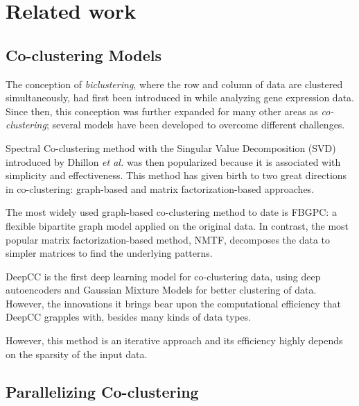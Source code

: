 
\section{Related work}
\label{sec:related_work}
\subsection{Co-clustering Models}

The conception of \emph{biclustering}, where the row and column of data are clustered simultaneously, had first been introduced in\cite{hartigan1972DirectClusteringData} while analyzing gene expression data. Since then, this conception was further expanded for many other areas as \emph{co-clustering}; several models have been developed to overcome different challenges.

Spectral Co-clustering method with the Singular Value Decomposition (SVD) introduced by  Dhillon \textit{et al.} \cite{dhillon2001CoclusteringDocumentsWords} was then popularized because it is associated with simplicity and effectiveness. This method has given birth to two great directions in co-clustering: graph-based and matrix factorization-based approaches. 

The most widely used graph-based co-clustering method to date is FBGPC\cite{chen2023FastFlexibleBipartitea}: a flexible bipartite graph model applied on the original data. In contrast, the most popular matrix factorization-based method, NMTF\cite{long2005CoclusteringBlockValue}, decomposes the data to simpler matrices to find the underlying patterns. 

DeepCC\cite{dongkuanxu2019DeepCoClustering} is the first deep learning model for co-clustering data, using deep autoencoders and Gaussian Mixture Models for better clustering of data. However, the innovations it brings bear upon the computational efficiency that DeepCC grapples with, besides many kinds of data types. 


However, this method is an iterative approach and its efficiency highly depends on the sparsity of the input data.

\subsection{Parallelizing Co-clustering}

